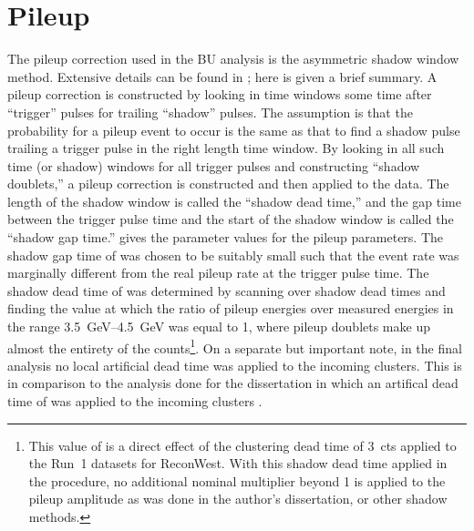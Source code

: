 
\graphicspath{{Body/Figures/Pileup/}{Body/Figures/Pileup/Amplitude/}{Body/Figures/Pileup/TimeShift/}{Body/Figures/Pileup/EnergyModel/}{Body/Figures/Pileup/TriplePileup/}{Body/Figures/Pileup/RateError/}}

\section{Pileup}

The pileup correction used in the BU analysis is the asymmetric shadow window method. Extensive details can be found in ; here is given a brief summary. A pileup correction is constructed by looking in time windows some time after ``trigger'' pulses for trailing ``shadow'' pulses. The assumption is that the probability for a pileup event to occur is the same as that to find a shadow pulse trailing a trigger pulse in the right length time window. By looking in all such time (or shadow) windows for all trigger pulses and constructing ``shadow doublets,'' a pileup correction is constructed and then applied to the data. The length of the shadow window is called the ``shadow dead time,'' and the gap time between the trigger pulse time and the start of the shadow window is called the ``shadow gap time.''   gives the parameter values for the pileup parameters. The shadow gap time of  was chosen to be suitably small such that the event rate was marginally different from the real pileup rate at the trigger pulse time. The shadow dead time of  was determined by scanning over shadow dead times and finding the value at which the ratio of pileup energies over measured energies in the range \SIrange{3.5}{4.5}{\GeV} was equal to 1, where pileup doublets make up almost the entirety of the counts\footnote{This value of  is a direct effect of the clustering dead time of 3~cts applied to the Run~1 datasets for ReconWest. With this shadow dead time applied in the procedure, no additional nominal multiplier beyond 1 is applied to the pileup amplitude as was done in the author's dissertation, or other shadow methods.}. On a separate but important note, in the final analysis no local artificial dead time was applied to the incoming clusters. This is in comparison to the analysis done for the dissertation in which an artifical dead time of  was applied to the incoming clusters \cite{phdthesis:2020Kinnaird}.


